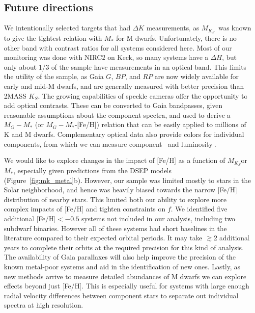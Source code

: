 \documentclass[twocolumn]{aastex62}
\newcommand{\mks}{$M_{K_S}$}
\begin{document}
\subsection{Future directions}

We intentionally selected targets that had $\Delta K$ measurements, as \mks\ was known to give the tightest relation with $M_*$ for M dwarfs. Unfortunately, there is no other band with contrast ratios for all systems considered here. Most of our monitoring was done with NIRC2 on Keck, so many systems have a $\Delta H$, but only about 1/3 of the sample have measurements in an optical band. This limits the utility of the sample, as Gaia $G$, $BP$, and $RP$ are now widely available for early and mid-M dwarfs, and are generally measured with better precision than 2MASS $K_S$. The growing capabilities of speckle cameras \citep[e.g.,][]{2009AJ....137.5057H} offer the opportunity to add optical contrasts. These can be converted to Gaia bandpasses, given reasonable assumptions about the component spectra, and used to derive a $M_{G}-M_*$ (or $M_G-M_*$-[Fe/H]) relation that can be easily applied to millions of K and M dwarfs. Complementary optical data also provide colors for individual components, from which we can measure component \teff\ and luminosity \citep[e.g.,][]{2017ApJ...845...72K}.

We would like to explore changes in the impact of [Fe/H] as a function of \mks or $M_*$, especially given predictions from the DSEP models (Figure~\ref{fig:mk_metal}b). However, our sample was limited mostly to stars in the Solar neighborhood, and hence was heavily biased towards the narrow [Fe/H] distribution of nearby stars. This limited both our ability to explore more complex impacts of [Fe/H] and tighten constraints on $f$. We identified five additional [Fe/H]$<-0.5$ systems not included in our analysis, including two subdwarf binaries. However all of these systems had short baselines in the literature compared to their expected orbital periods. It may take $\gtrsim$2 additional years to complete their orbits at the required precision for this kind of analysis. The availability of Gaia parallaxes will also help improve the precision of the known metal-poor systems and aid in the identification of new ones. Lastly, as new methods arrive to measure detailed abundances of M dwarfs \citep{Veyette2016a,Veyette2017} we can explore effects beyond just [Fe/H]. This is especially useful for systems with large enough radial velocity differences between component stars to separate out individual spectra at high resolution.
\end{document}
